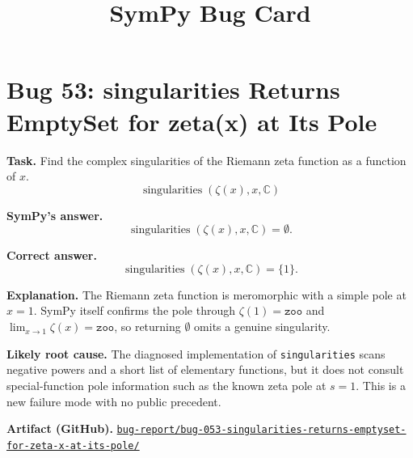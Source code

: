 \documentclass[11pt]{article}
\title{SymPy Bug Card}
\author{}
\date{}
\newcommand{\artifactrepo}{https://github.com/TODO-org/TODO-repo}
\newcommand{\bugbundle}[1]{\href{\artifactrepo/tree/main/bug-report/#1}{\nolinkurl{bug-report/#1/}}}
\begin{document}
\maketitle

\section*{Bug 53: singularities Returns EmptySet for zeta(x) at Its Pole}

\begin{counterexamplebox}
\textbf{Task.} Find the complex singularities of the Riemann zeta function as a function of \(x\).
\[
\operatorname{singularities}(\zeta(x), x, \mathbb{C})
\]

\medskip
\textbf{SymPy's answer.}
\[
\operatorname{singularities}(\zeta(x), x, \mathbb{C})=\emptyset .
\]

\medskip
\textbf{Correct answer.}
\[
\operatorname{singularities}(\zeta(x), x, \mathbb{C})=\{1\}.
\]

\medskip
\textbf{Explanation.} The Riemann zeta function is meromorphic with a simple pole at \(x=1\). SymPy itself confirms the pole through \(\zeta(1)=\mathtt{zoo}\) and \(\lim_{x\to 1}\zeta(x)=\mathtt{zoo}\), so returning \(\emptyset\) omits a genuine singularity.

\medskip
\textbf{Likely root cause.} The diagnosed implementation of \texttt{singularities} scans negative powers and a short list of elementary functions, but it does not consult special-function pole information such as the known zeta pole at \(s=1\). This is a new failure mode with no public precedent.

\medskip
\textbf{Artifact (GitHub).} \bugbundle{bug-053-singularities-returns-emptyset-for-zeta-x-at-its-pole}
\end{counterexamplebox}
\end{document}
